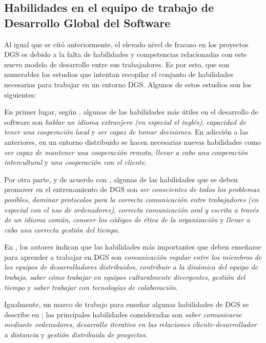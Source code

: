 \subsection{Habilidades en el equipo de trabajo de Desarrollo Global del Software}
\label{sec:HabilidadesT}

Al igual que se citó anteriormente, el elevado nivel de fracaso en los proyectos DGS es debido a la falta de habilidades y competencias relacionadas con este nuevo modelo de desarrollo entre sus trabajadores. Es por esto, que son numerables los estudios que intentan recopilar el conjunto de habilidades necesarias para trabajar en un entorno DGS. Algunos de estos estudios son los siguientes:

En primer lugar, según \cite{bosnic2019assessing}, algunas de las habilidades más útiles en el desarrollo de software son \emph{hablar un idioma extranjero (en especial el inglés)}, \emph{capacidad de tener una cooperación local} y \emph{ser capaz de tomar decisiones}. En adicción a las anteriores, en un entorno distribuido se hacen necesarias nuevas habilidades como \emph{ser capaz de mantener una cooperación remota}, \emph{llevar a cabo una cooperación intercultural} y \emph{una cooperación con el cliente}.

Por otra parte, y de acuerdo con \cite{monasor2010training}, algunas de las habilidades que se deben promover en el entrenamiento de DGS son \emph{ser conscientes de todos los problemas posibles}, \emph{dominar protocolos para la correcta comunicación entre trabajadores (en especial con el uso de ordenadores)}, \emph{correcta comunicación oral y escrita a través de un idioma común}, \emph{conocer los códigos de ética de la organización} y \emph{llevar a cabo una correcta gestión del tiempo}.

En \cite{paasivaara2013teaching}, los autores indican que las habilidades más importantes que deben enseñarse para aprender a trabajar en DGS son \emph{comunicación regular entre los miembros de los equipos de desarrolladores distribuidos}, \emph{contribuir a la dinámica del equipo de trabajo}, \emph{saber cómo trabajar en equipos culturalmente divergentes}, \emph{gestión del tiempo} y \emph{saber trabajar con tecnologías de colaboración}.

Igualmente, un marco de trabajo para enseñar algunas habilidades de DGS se describe en \cite{damian2006instructional}; las principales habilidades consideradas son \emph{saber comunicarse mediante ordenadores}, \emph{desarrollo iterativo en las relaciones cliente-desarrollador a distancia} y \emph{gestión distribuida de proyectos}.

